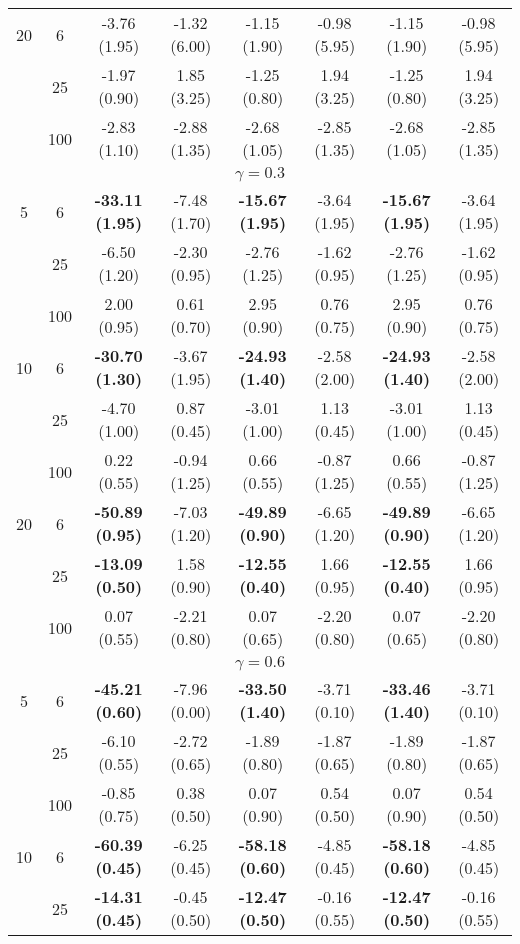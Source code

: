 \documentclass[
  man]{apa6}
\newenvironment{lltable}{\begin{landscape}\centering\begin{ThreePartTable}}{\end{ThreePartTable}\end{landscape}}
\begin{document}
\begin{lltable}
{\begin{longtable}{cccccccc}
20 & 6 & -3.76 (1.95) & -1.32 (6.00) & -1.15 (1.90) & -0.98 (5.95) & -1.15 (1.90) & -0.98 (5.95)\\
 & 25 & -1.97 (0.90) & 1.85 (3.25) & -1.25 (0.80) & 1.94 (3.25) & -1.25 (0.80) & 1.94 (3.25)\\
 & 100 & -2.83 (1.10) & -2.88 (1.35) & -2.68 (1.05) & -2.85 (1.35) & -2.68 (1.05) & -2.85 (1.35)\\
\multicolumn{8}{c}{$\gamma = 0.3$}\\
5 & 6 & \textbf{-33.11 (1.95)} & -7.48 (1.70) & \textbf{-15.67 (1.95)} & -3.64 (1.95) & \textbf{-15.67 (1.95)} & -3.64 (1.95)\\
 & 25 & -6.50 (1.20) & -2.30 (0.95) & -2.76 (1.25) & -1.62 (0.95) & -2.76 (1.25) & -1.62 (0.95)\\
 & 100 & 2.00 (0.95) & 0.61 (0.70) & 2.95 (0.90) & 0.76 (0.75) & 2.95 (0.90) & 0.76 (0.75)\\
10 & 6 & \textbf{-30.70 (1.30)} & -3.67 (1.95) & \textbf{-24.93 (1.40)} & -2.58 (2.00) & \textbf{-24.93 (1.40)} & -2.58 (2.00)\\
 & 25 & -4.70 (1.00) & 0.87 (0.45) & -3.01 (1.00) & 1.13 (0.45) & -3.01 (1.00) & 1.13 (0.45)\\
 & 100 & 0.22 (0.55) & -0.94 (1.25) & 0.66 (0.55) & -0.87 (1.25) & 0.66 (0.55) & -0.87 (1.25)\\
20 & 6 & \textbf{-50.89 (0.95)} & -7.03 (1.20) & \textbf{-49.89 (0.90)} & -6.65 (1.20) & \textbf{-49.89 (0.90)} & -6.65 (1.20)\\
 & 25 & \textbf{-13.09 (0.50)} & 1.58 (0.90) & \textbf{-12.55 (0.40)} & 1.66 (0.95) & \textbf{-12.55 (0.40)} & 1.66 (0.95)\\
 & 100 & 0.07 (0.55) & -2.21 (0.80) & 0.07 (0.65) & -2.20 (0.80) & 0.07 (0.65) & -2.20 (0.80)\\
\multicolumn{8}{c}{$\gamma = 0.6$}\\
5 & 6 & \textbf{-45.21 (0.60)} & -7.96 (0.00) & \textbf{-33.50 (1.40)} & -3.71 (0.10) & \textbf{-33.46 (1.40)} & -3.71 (0.10)\\
 & 25 & -6.10 (0.55) & -2.72 (0.65) & -1.89 (0.80) & -1.87 (0.65) & -1.89 (0.80) & -1.87 (0.65)\\
 & 100 & -0.85 (0.75) & 0.38 (0.50) & 0.07 (0.90) & 0.54 (0.50) & 0.07 (0.90) & 0.54 (0.50)\\
10 & 6 & \textbf{-60.39 (0.45)} & -6.25 (0.45) & \textbf{-58.18 (0.60)} & -4.85 (0.45) & \textbf{-58.18 (0.60)} & -4.85 (0.45)\\
 & 25 & \textbf{-14.31 (0.45)} & -0.45 (0.50) & \textbf{-12.47 (0.50)} & -0.16 (0.55) & \textbf{-12.47 (0.50)} & -0.16 (0.55)\\

\end{longtable}}
\end{lltable}
\end{document}
